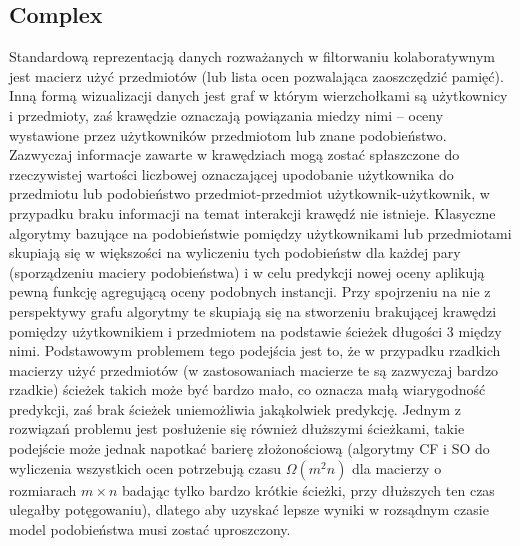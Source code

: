 \documentclass{pracamgr}
\begin{document}
   \subsection{Complex}
    Standardową reprezentacją danych rozważanych w filtorwaniu kolaboratywnym jest macierz użyć przedmiotów (lub lista ocen pozwalająca zaoszczędzić pamięć).
    Inną formą wizualizacji danych jest graf w którym wierzchołkami są użytkownicy i przedmioty, zaś krawędzie oznaczają powiązania miedzy nimi
    -- oceny wystawione przez użytkowników przedmiotom lub znane podobieństwo. Zazwyczaj informacje zawarte w krawędziach mogą zostać spłaszczone do
    rzeczywistej wartości liczbowej oznaczającej upodobanie użytkownika do przedmiotu lub podobieństwo przedmiot-przedmiot użytkownik-użytkownik,
    w przypadku braku informacji na temat interakcji krawędź nie istnieje.
    Klasyczne algorytmy bazujące na podobieństwie pomiędzy użytkownikami lub przedmiotami skupiają się w większości na wyliczeniu tych podobieństw
    dla każdej pary (sporządzeniu maciery podobieństwa) i w celu predykcji nowej oceny aplikują pewną funkcję agregującą oceny podobnych instancji.
    Przy spojrzeniu na nie z perspektywy grafu algorytmy te skupiają się na stworzeniu brakującej krawędzi pomiędzy użytkownikiem i przedmiotem na podstawie
    ścieżek długości 3 między nimi.\newline
    Podstawowym problemem tego podejścia jest to, że w przypadku rzadkich macierzy użyć przedmiotów (w zastosowaniach macierze te są zazwyczaj bardzo rzadkie)
    ścieżek takich może być bardzo mało, co oznacza małą wiarygodność predykcji, zaś brak ścieżek uniemożliwia jakąkolwiek predykcję.
    Jednym z rozwiązań problemu jest posłużenie się również dłuższymi ścieżkami, takie podejście może jednak napotkać barierę złożonościową
    (algorytmy CF i SO do wyliczenia wszystkich ocen potrzebują czasu $\Omega(m^2n)$ dla macierzy o rozmiarach $m\times n$ badając tylko bardzo krótkie ścieżki,
    przy dłuższych ten czas ulegałby potęgowaniu), dlatego aby uzyskać lepsze wyniki w rozsądnym czasie model podobieństwa musi zostać uproszczony.
\end{document}
